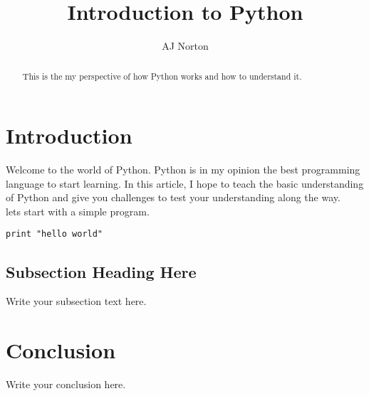 \documentclass{article}
\begin{document}
\lstset{language=Python}          %

\title{Introduction to Python}
\author{AJ Norton}

\maketitle

\begin{abstract}
This is the my perspective of how Python works and how to understand it.
\end{abstract}

\section{Introduction}
Welcome to the world of Python.  Python is in my opinion the best programming language to start learning.  In this article, I hope to teach the basic understanding of Python and give you challenges to test your understanding along the way.
\\[.5in]
lets start with a simple program.

\begin{lstlisting}[frame=single] 
print "hello world"
\end{lstlisting}




\subsection{Subsection Heading Here}
Write your subsection text here.

\section{Conclusion}
Write your conclusion here.
\end{document}
